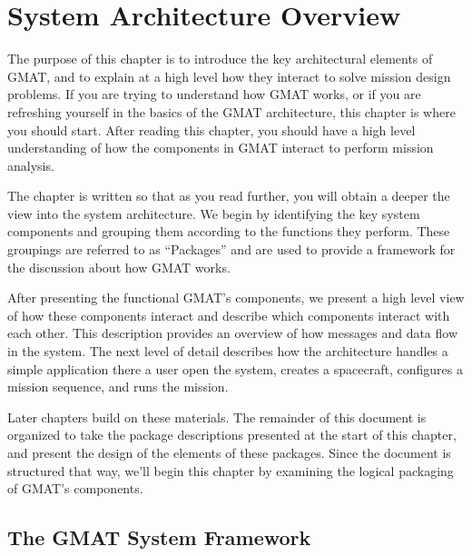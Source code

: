 \chapter{\label{chapter:TopLevel}System Architecture Overview}

The purpose of this chapter is to introduce the key architectural elements of GMAT, and to explain
at a high level how they interact to solve mission design problems.  If you are trying to understand
how GMAT works, or if you are refreshing yourself in the basics of the GMAT architecture, this
chapter is where you should start.  After reading this chapter, you should have a high level
understanding of how the components in GMAT interact to perform mission analysis.

The chapter is written so that as you read further, you will obtain a deeper the view into the
system architecture.  We begin by identifying the key system components and grouping them according
to the functions they perform.  These groupings are referred to as ``Packages'' and are used to
provide a framework for the discussion about how GMAT works.

After presenting the functional GMAT's components, we present a high level view of how these
components interact and describe which components interact with each other.  This description
provides an overview of how messages and data flow in the system.  The next level of detail
describes how the architecture handles a simple application there a user open the system, creates a
spacecraft, configures a mission sequence, and runs the mission.

Later chapters build on these materials.  The remainder of this document is organized to take the
package descriptions presented at the start of this chapter, and present the design of the elements
of these packages.  Since the document is structured that way, we'll begin this chapter by examining
the logical packaging of GMAT's components.

\section{\label{section:Packaging}The GMAT System Framework}

